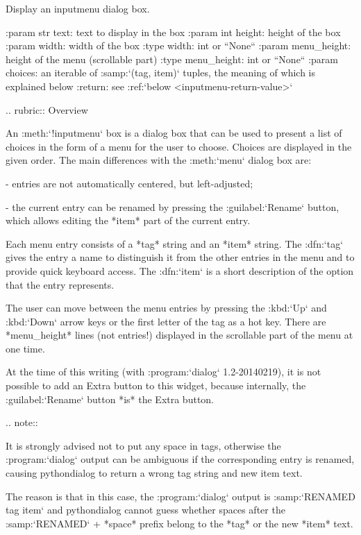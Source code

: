 \begin{DoxyVerb}Display an inputmenu dialog box.

:param str text:    text to display in the box
:param int height:  height of the box
:param width:       width of the box
:type width:        int or ``None``
:param menu_height: height of the menu (scrollable part)
:type menu_height:  int or ``None``
:param choices:     an iterable of :samp:`({tag}, {item})`
            tuples, the meaning of which is explained
            below
:return:            see :ref:`below <inputmenu-return-value>`


.. rubric:: Overview

An :meth:`!inputmenu` box is a dialog box that can be used to
present a list of choices in the form of a menu for the user to
choose. Choices are displayed in the given order. The main
differences with the :meth:`menu` dialog box are:

  - entries are not automatically centered, but left-adjusted;

  - the current entry can be renamed by pressing the
    :guilabel:`Rename` button, which allows editing the *item*
    part of the current entry.

Each menu entry consists of a *tag* string and an *item* string.
The :dfn:`tag` gives the entry a name to distinguish it from the
other entries in the menu and to provide quick keyboard access.
The :dfn:`item` is a short description of the option that the
entry represents.

The user can move between the menu entries by pressing the
:kbd:`Up` and :kbd:`Down` arrow keys or the first letter of the
tag as a hot key. There are *menu_height* lines (not entries!)
displayed in the scrollable part of the menu at one time.

At the time of this writing (with :program:`dialog`
1.2-20140219), it is not possible to add an Extra button to this
widget, because internally, the :guilabel:`Rename` button *is*
the Extra button.

.. note::

  It is strongly advised not to put any space in tags, otherwise
  the :program:`dialog` output can be ambiguous if the
  corresponding entry is renamed, causing pythondialog to return
  a wrong tag string and new item text.

  The reason is that in this case, the :program:`dialog` output
  is :samp:`RENAMED {tag} {item}` and pythondialog cannot guess
  whether spaces after the :samp:`RENAMED` + *space* prefix
  belong to the *tag* or the new *item* text.


\end{DoxyVerb}
